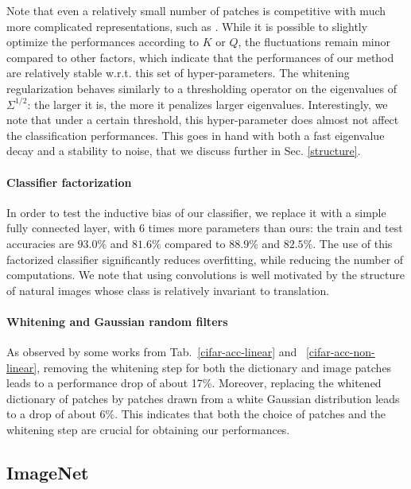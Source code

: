 \documentclass{article} %
\begin{document}
Note that even a relatively small number of patches is competitive with much more complicated representations, such as \citet{Oyallon_2015_CVPR}.
While it is possible to slightly optimize the performances according to $K$ or $Q$,  the fluctuations remain minor compared to other factors, which indicate that the performances of our method are relatively stable w.r.t. this set of hyper-parameters. The whitening regularization behaves similarly to a thresholding operator on the eigenvalues of $\Sigma^{1/2}$: the larger it is, the more it penalizes larger eigenvalues. Interestingly, we note that under a certain threshold, this hyper-parameter  does almost not affect the classification performances. This goes in hand with both a fast eigenvalue decay and a stability to noise, that we discuss further in Sec. \ref{structure}.

\paragraph{Classifier factorization}
In order to test the inductive bias of our classifier, we  replace it with a simple fully connected layer, with $6$ times more parameters than ours: the train and test accuracies are $93.0\%$ and $81.6\%$ compared to $88.9\%$ and $82.5\%$. The use of this factorized classifier significantly reduces overfitting, while reducing the number of computations. We note that using convolutions is well motivated by the  structure of natural images whose class is relatively invariant to translation.

\paragraph{Whitening and Gaussian random filters}
As observed by some  works from Tab.~\ref{cifar-acc-linear} and ~\ref{cifar-acc-non-linear}, removing the whitening step for both the dictionary and image patches leads to  a  performance drop  of about 17\%.
Moreover, replacing the whitened dictionary of patches by patches drawn from a white Gaussian distribution leads to a drop of about 6\%. This indicates that both the choice of patches and the whitening step are crucial for obtaining our performances. 



\subsection{ImageNet}
\end{document}

